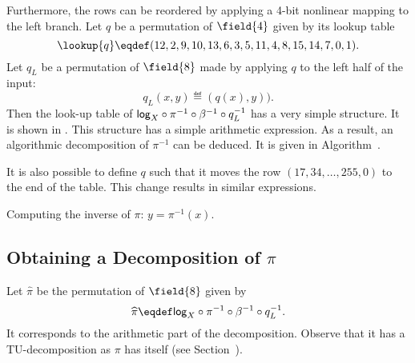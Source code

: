 
Furthermore, the rows can be reordered by applying a 4-bit nonlinear mapping to the left branch. Let $q$ be a permutation of $\field{4}$ given by its lookup table
$$
\lookup{q} \eqdef (12, 2, 9, 10, 13, 6, 3, 5, 11, 4, 8, 15, 14, 7, 0, 1).
$$
Let $q_L$ be a permutation of $\field{8}$ made by applying $q$ to the left half of the input:
$$
q_L(x, y) \eqdef (q(x), y)).
$$
Then the look-up table of $\mathsf{log}_{X} \circ \pi^{-1} \circ \beta^{-1} \circ q_L^{-1}$ has a very simple structure. It is shown in . This structure has a simple arithmetic expression. As a result, an algorithmic decomposition of $\pi^{-1}$ can be deduced. It is given in Algorithm~.

\begin{remark}
It is also possible to define $q$ such that it moves the row $(17, 34, \ldots, 255, 0)$ to the end of the table. This change results in similar expressions.
\end{remark}


\begin{algorithm}
    \caption{
        Computing the inverse of $\pi$: $y = \pi^{-1}(x)$.
    }
    \begin{algorithmic}[1]
             
        \Else
             
        \EndIf
    \end{algorithmic}
\end{algorithm}


\subsection{Obtaining a Decomposition of $\pi$}

\newcommand\arith{\widehat{\pi}}
Let $\arith$ be the permutation of $\field{8}$ given by
$$
    \arith \eqdef \plog{X} \circ \pi^{-1} \circ \beta^{-1} \circ q_L^{-1}.
$$
It corresponds to the arithmetic part of the decomposition. Observe that it has a TU-decomposition as $\pi$ has itself (see Section~).

